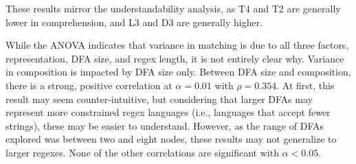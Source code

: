 These results mirror the understandability analysis, as T4 and T2 are generally lower in comprehension, and L3 and D3 are generally higher.%

While the ANOVA indicates that variance in matching is due to all three factors, representation, DFA size, and regex length, it is not entirely clear why. Variance in composition is impacted by DFA size only. 
Between DFA size and composition, there is a strong, positive correlation at $\alpha = 0.01$ with $\rho = 0.354$. 
At first, this result may seem counter-intuitive, but considering that larger DFAs may represent more constrained regex languages (i.e., languages that accept fewer strings), these may be easier to understand. 
However, as the range of DFAs explored was between two and eight nodes, these results may not generalize to larger regexes. 
None of the other correlations are significant with $\alpha < 0.05$.  %



